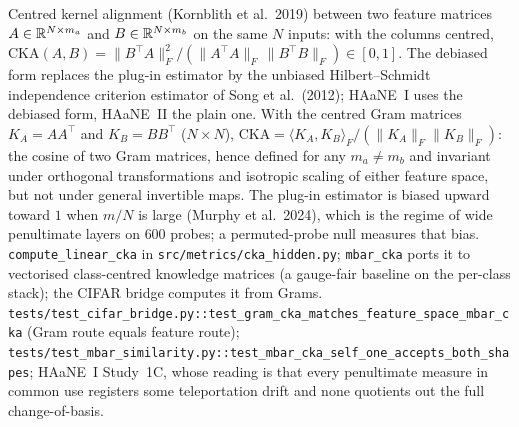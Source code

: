{Centred kernel alignment (Kornblith et al.\ 2019) between two feature matrices $A\in\mathbb{R}^{N\times m_a}$ and $B\in\mathbb{R}^{N\times m_b}$ on the same $N$ inputs: with the columns centred, $\mathrm{CKA}(A,B)=\|B^\top A\|_F^2/(\|A^\top A\|_F\,\|B^\top B\|_F)\in[0,1]$. The debiased form replaces the plug-in estimator by the unbiased Hilbert--Schmidt independence criterion estimator of Song et al.\ (2012); HAaNE~I uses the debiased form, HAaNE~II the plain one.}
{With the centred Gram matrices $K_A=AA^\top$ and $K_B=BB^\top$ ($N\times N$), $\mathrm{CKA}=\langle K_A,K_B\rangle_F/(\|K_A\|_F\|K_B\|_F)$: the cosine of two Gram matrices, hence defined for any $m_a\neq m_b$ and invariant under orthogonal transformations and isotropic scaling of either feature space, but not under general invertible maps. The plug-in estimator is biased upward toward $1$ when $m/N$ is large (Murphy et al.\ 2024), which is the regime of wide penultimate layers on $600$ probes; a permuted-probe null measures that bias.}
{\texttt{compute\_linear\_cka} in \texttt{src/metrics/cka\_hidden.py}; \texttt{mbar\_cka} ports it to vectorised class-centred knowledge matrices (a gauge-fair baseline on the per-class stack); the CIFAR bridge computes it from Grams.}
{\texttt{tests/test\_cifar\_bridge.py::test\_gram\_cka\_matches\_feature\_space\_mbar\_cka} (Gram route equals feature route); \texttt{tests/test\_mbar\_similarity.py::test\_mbar\_cka\_self\_one\_accepts\_both\_shapes}; HAaNE~I Study~1C, whose reading is that every penultimate measure in common use registers some teleportation drift and none quotients out the full change-of-basis.}
